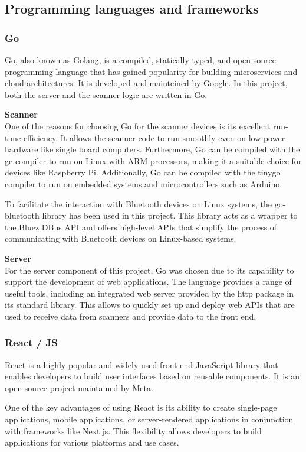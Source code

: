 \documentclass[a4paper, 11pt]{article}
\begin{document}
\subsection{Programming languages and frameworks}
\subsubsection{Go}
Go, also known as Golang, is a compiled, statically typed, and open source programming language that has gained popularity for building microservices and cloud architectures. It is developed and mainteined by Google. In this project, both the server and the scanner logic are written in Go.

\textbf{Scanner}\\
One of the reasons for choosing Go for the scanner devices is its excellent run-time efficiency. It allows the scanner code to run smoothly even on low-power hardware like single board computers. Furthermore, Go can be compiled with the gc compiler to run on Linux with ARM processors, making it a suitable choice for devices like Raspberry Pi. Additionally, Go can be compiled with the tinygo compiler to run on embedded systems and microcontrollers such as Arduino.

To facilitate the interaction with Bluetooth devices on Linux systems, the go-bluetooth library \cite{go-bluetooth} has been used in this project. This library acts as a wrapper to the Bluez DBus API and offers high-level APIs that simplify the process of communicating with Bluetooth devices on Linux-based systems.

\textbf{Server}\\
For the server component of this project, Go was chosen due to its capability to support the development of web applications. The language provides a range of useful tools, including an integrated web server provided by the http package \cite{go-http} in its standard library. This allows to quickly set up and deploy web APIs that are used to receive data from scanners and provide data to the front end.

\subsubsection{React / JS}
React \cite{react} is a highly popular and widely used front-end JavaScript library that enables developers to build user interfaces based on reusable components. It is an open-source project maintained by Meta.

One of the key advantages of using React is its ability to create single-page applications, mobile applications, or server-rendered applications in conjunction with frameworks like Next.js. This flexibility allows developers to build applications for various platforms and use cases.
\end{document}
